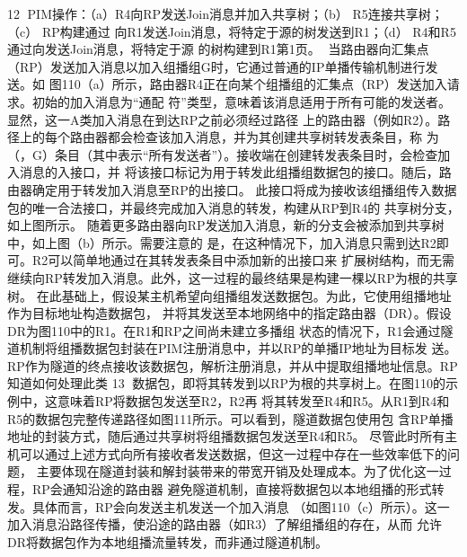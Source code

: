                                               12
PIM操作：（a）R4向RP发送Join消息并加入共享树；（b） R5连接共享树；（c） RP构建通过
向R1发送Join消息，将特定于源的树发送到R1；（d） R4和R5通过向发送Join消息，将特定于源
                     的树构建到R1第1页。
当路由器向汇集点（RP）发送加入消息以加入组播组G时，它通过普通的IP单播传输机制进行发送。如
图110（a）所示，路由器R4正在向某个组播组的汇集点（RP）发送加入请求。初始的加入消息为“通配
符”类型，意味着该消息适用于所有可能的发送者。显然，这一A类加入消息在到达RP之前必须经过路径
上的路由器（例如R2）。路径上的每个路由器都会检查该加入消息，并为其创建共享树转发表条目，称
为（，G）条目（其中表示“所有发送者”）。接收端在创建转发表条目时，会检查加入消息的入接口，并
将该接口标记为用于转发此组播组数据包的接口。随后，路由器确定用于转发加入消息至RP的出接口。
此接口将成为接收该组播组传入数据包的唯一合法接口，并最终完成加入消息的转发，构建从RP到R4的
共享树分支，如上图所示。
随着更多路由器向RP发送加入消息，新的分支会被添加到共享树中，如上图（b）所示。需要注意的
是，在这种情况下，加入消息只需到达R2即可。R2可以简单地通过在其转发表条目中添加新的出接口来
扩展树结构，而无需继续向RP转发加入消息。此外，这一过程的最终结果是构建一棵以RP为根的共享
树。
在此基础上，假设某主机希望向组播组发送数据包。为此，它使用组播地址作为目标地址构造数据包，
并将其发送至本地网络中的指定路由器（DR）。假设DR为图110中的R1。在R1和RP之间尚未建立多播组
状态的情况下，R1会通过隧道机制将组播数据包封装在PIM注册消息中，并以RP的单播IP地址为目标发
送。RP作为隧道的终点接收该数据包，解析注册消息，并从中提取组播地址信息。RP知道如何处理此类
                                                  13
数据包，即将其转发到以RP为根的共享树上。在图110的示例中，这意味着RP将数据包发送至R2，R2再
将其转发至R4和R5。从R1到R4和R5的数据包完整传递路径如图111所示。可以看到，隧道数据包使用包
含RP单播地址的封装方式，随后通过共享树将组播数据包发送至R4和R5。
尽管此时所有主机可以通过上述方式向所有接收者发送数据，但这一过程中存在一些效率低下的问题，
主要体现在隧道封装和解封装带来的带宽开销及处理成本。为了优化这一过程，RP会通知沿途的路由器
避免隧道机制，直接将数据包以本地组播的形式转发。具体而言，RP会向发送主机发送一个加入消息
（如图110（c）所示）。这一加入消息沿路径传播，使沿途的路由器（如R3）了解组播组的存在，从而
允许DR将数据包作为本地组播流量转发，而非通过隧道机制。




